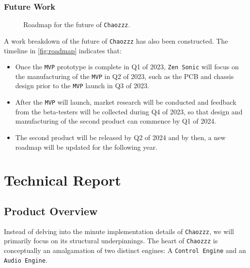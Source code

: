 \documentclass[12pt]{article}
\begin{document}
\subsubsection{Future Work}
\begin{figure}[ht]
    \centering
    \caption{Roadmap for the future of \texttt{Chaozzz}.}%
    \label{fig:roadmap}
\end{figure}

A work breakdown of the future of \texttt{Chaozzz} has also been constructed. The timeline in \autoref{fig:roadmap} indicates that:
\begin{itemize}
    \item Once the \texttt{MVP} prototype is complete in Q1 of 2023, \texttt{Zen Sonic} will focus on the manufacturing of the \texttt{MVP} in Q2 of 2023, such as the PCB and chassis design prior to the \texttt{MVP} launch in Q3 of 2023. 
    
    \item After the \texttt{MVP} will launch, market research will be conducted and feedback from the beta-testers will be collected during Q4 of 2023, so that design and manufacturing of the second product can commence by Q1 of 2024. 

    \item The second product will be released by Q2 of 2024 and by then, a new roadmap will be updated for the following year.
\end{itemize}

\section{Technical Report}
\subsection{Product Overview}
Instead of delving into the minute implementation details of \texttt{Chaozzz}, we will primarily focus on its structural underpinnings. The heart of \texttt{Chaozzz} is conceptually an amalgamation of two distinct engines: A \texttt{Control Engine} and an \texttt{Audio Engine}. 
\end{document}
